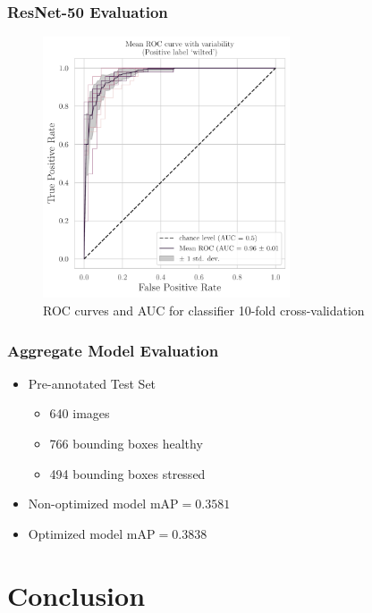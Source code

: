 \documentclass{beamer}
\begin{document}
\begin{frame}
  \frametitle{ResNet-50 Evaluation}
  \begin{center}
    \begin{figure}[htbp]
      \includegraphics[width=0.65\textwidth]{graphics/classifier-hyp-folds.pdf}
      \caption{\scriptsize ROC curves and AUC for classifier 10-fold
        cross-validation}
    \end{figure}
  \end{center}
\end{frame}

\begin{frame}
  \frametitle{Aggregate Model Evaluation}
  \begin{itemize}
    \setlength{\itemsep}{1.1\baselineskip}
  \item Pre-annotated Test Set
    \begin{itemize}
    \item \num{640} images
    \item \num{766} bounding boxes healthy
    \item \num{494} bounding boxes stressed \pause
    \end{itemize}
  \item Non-optimized model $\mathrm{mAP} = 0.3581$ \pause
  \item Optimized model $\mathrm{mAP} = 0.3838$
  \end{itemize}
\end{frame}

\section{Conclusion}
\end{document}
